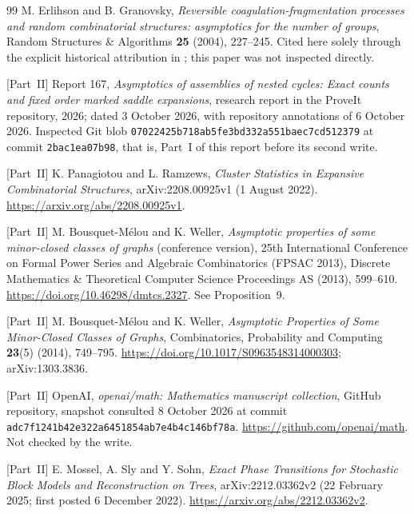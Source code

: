 \documentclass[11pt,letterpaper]{article}
\numberwithin{equation}{section}
\theoremstyle{remark}\newtheorem{remark}[theorem]{Remark}
\theoremstyle{definition}\newtheorem{definition}[theorem]{Definition}\theoremstyle{plain}
\begin{document}
\begin{thebibliography}{99}
M. Erlihson and B. Granovsky,
\emph{Reversible coagulation-fragmentation processes and random
combinatorial structures: asymptotics for the number of groups},
Random Structures \& Algorithms \textbf{25} (2004), 227--245.
Cited here solely through the explicit historical attribution in
\cite[Corollary 4.5 and reference 12]{eg2008}; this paper was not
inspected directly.

[Part~II] Report 167, \emph{Asymptotics of assemblies of nested cycles: Exact counts and fixed
order marked saddle expansions}, research report in the ProveIt repository, 2026; dated 3 October
2026, with repository annotations of 6 October 2026. Inspected Git blob
\texttt{07022425b718ab5fe3bd332a551baec7cd512379} at commit \texttt{2bac1ea07b98}, that is,
Part~I of this report before its second write.

[Part~II] K. Panagiotou and L. Ramzews, \emph{Cluster Statistics in Expansive Combinatorial
Structures}, arXiv:2208.00925v1 (1 August 2022). \url{https://arxiv.org/abs/2208.00925v1}.

[Part~II] M. Bousquet-M\'elou and K. Weller, \emph{Asymptotic properties of some minor-closed
classes of graphs} (conference version), 25th International Conference on Formal Power Series and
Algebraic Combinatorics (FPSAC 2013), Discrete Mathematics \& Theoretical Computer Science
Proceedings AS (2013), 599--610. \url{https://doi.org/10.46298/dmtcs.2327}. See Proposition~9.

[Part~II] M. Bousquet-M\'elou and K. Weller, \emph{Asymptotic Properties of Some Minor-Closed
Classes of Graphs}, Combinatorics, Probability and Computing \textbf{23}(5) (2014), 749--795.
\url{https://doi.org/10.1017/S0963548314000303}; arXiv:1303.3836.

[Part~II] OpenAI, \emph{openai/math: Mathematics manuscript collection}, GitHub repository,
snapshot consulted 8 October 2026 at commit \texttt{adc7f1241b42e322a6451854ab7e4b4c146bf78a}.
\url{https://github.com/openai/math}. Not checked by the write.

[Part~II] E. Mossel, A. Sly and Y. Sohn, \emph{Exact Phase Transitions for Stochastic Block Models
and Reconstruction on Trees}, arXiv:2212.03362v2 (22 February 2025; first posted 6 December 2022).
\url{https://arxiv.org/abs/2212.03362v2}.
\end{thebibliography}
\end{document}

